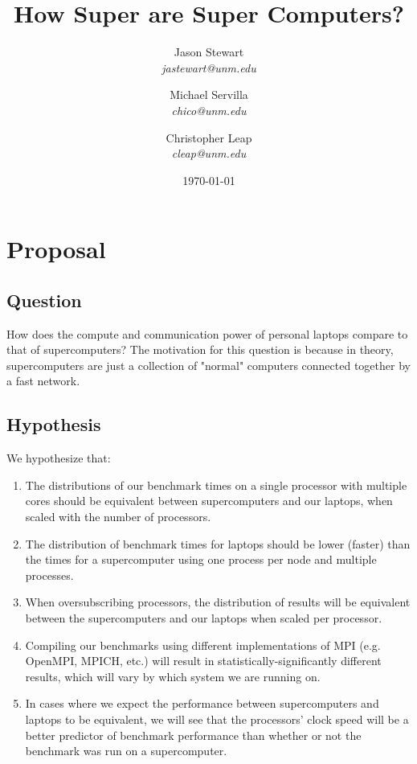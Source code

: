 \documentclass{article}
\title{How Super are Super Computers?}
\author{Jason Stewart\\
\textit{jastewart@unm.edu} 
\and
Michael Servilla\\
\textit{chico@unm.edu}
\and
Christopher Leap\\
\textit{cleap@unm.edu}
\date{\today}
}
\begin{document}
\maketitle

\section{Proposal}
\subsection{Question}
How does the compute and communication power of personal laptops compare to that of supercomputers? The motivation for this question is because in theory, supercomputers are just a collection of "normal" computers connected together by a fast network. 
\subsection{Hypothesis}

We hypothesize that:
\begin{enumerate}
    \item The distributions of our benchmark times on a single processor with multiple cores should be equivalent between supercomputers and our laptops, when scaled with the number of processors.
    \item The distribution of benchmark times for laptops should be lower (faster) than the times for a supercomputer using one process per node and multiple processes.
    \item When oversubscribing processors, the distribution of results will be equivalent between the supercomputers and our laptops when scaled per processor.
    \item Compiling our benchmarks using different implementations of MPI (e.g. OpenMPI, MPICH, etc.) will result in statistically-significantly different results, which will vary by which system we are running on.
    \item In cases where we expect the performance between supercomputers and laptops to be equivalent, we will see that the processors' clock speed will be a better predictor of benchmark performance than whether or not the benchmark was run on a supercomputer.
\end{enumerate}
\end{document}
